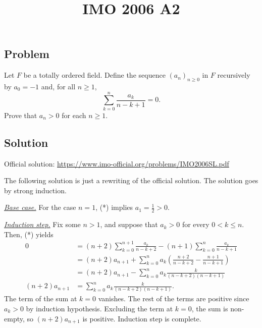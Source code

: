 \documentclass{article}
\title{IMO 2006 A2}
\author{}
\date{}
\begin{document}
\maketitle



\subsection*{Problem}

Let $F$ be a totally ordered field.
Define the sequence $(a_n)_{n \geq 0}$ in $F$ recursively by $a_0 = -1$ and, for all $n \geq 1$,
\[ \sum_{k = 0}^n \frac{a_k}{n - k + 1} = 0. \tag{*} \]
Prove that $a_n > 0$ for each $n \geq 1$.



\subsection*{Solution}

Official solution: \url{https://www.imo-official.org/problems/IMO2006SL.pdf}

The following solution is just a rewriting of the official solution.
The solution goes by strong induction.

\textit{\underline{Base case.}}
For the case $n = 1$, (*) implies $a_1 = \frac{1}{2} > 0$.

\textit{\underline{Induction step.}}
Fix some $n > 1$, and suppose that $a_k > 0$ for every $0 < k \leq n$.
Then, (*) yields
\begin{align*}
0
    &= (n + 2) \sum_{k = 0}^{n + 1} \frac{a_k}{n - k + 2} - (n + 1) \sum_{k = 0}^n \frac{a_k}{n - k + 1} \\
    &= (n + 2) a_{n + 1} + \sum_{k = 0}^n a_k \left(\frac{n + 2}{n - k + 2} - \frac{n + 1}{n - k + 1}\right) \\
    &= (n + 2) a_{n + 1} - \sum_{k = 0}^n a_k \frac{k}{(n - k + 2)(n - k + 1)} \\
(n + 2) a_{n + 1}
    &= \sum_{k = 0}^n a_k \frac{k}{(n - k + 2)(n - k + 1)}.
\end{align*}
The term of the sum at $k = 0$ vanishes.
The rest of the terms are positive since $a_k > 0$ by induction hypothesis.
Excluding the term at $k = 0$, the sum is non-empty, so $(n + 2) a_{n + 1}$ is positive.
Induction step is complete.
\end{document}
